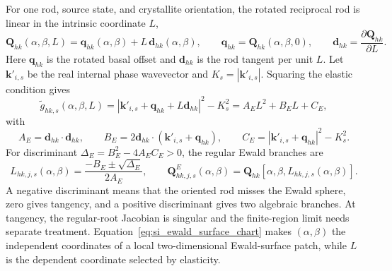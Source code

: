 For one rod, source state, and crystallite orientation, the rotated reciprocal rod is linear in the intrinsic coordinate $L$,
\begin{equation}
  \mathbf Q_{hk}(\alpha,\beta,L)
  =\mathbf q_{hk}(\alpha,\beta)
  +L\,\mathbf d_{hk}(\alpha,\beta),
  \qquad
  \mathbf q_{hk}=\mathbf Q_{hk}(\alpha,\beta,0),
  \qquad
  \mathbf d_{hk}=\frac{\partial\mathbf Q_{hk}}{\partial L}.
  \label{eq:si_oriented_rod_affine_L}
\end{equation}
Here $\mathbf q_{hk}$ is the rotated basal offset and $\mathbf d_{hk}$ is the rod tangent per unit $L$. Let $\mathbf k'_{i,s}$ be the real internal phase wavevector and $K_s=|\mathbf k'_{i,s}|$. Squaring the elastic condition gives
\begin{equation}
  \widetilde g_{hk,s}(\alpha,\beta,L)
  =\left|\mathbf k'_{i,s}+\mathbf q_{hk}+L\mathbf d_{hk}\right|^2-K_s^2
  =A_E L^2+B_E L+C_E,
  \label{eq:si_ewald_quadratic}
\end{equation}
with
\begin{equation}
  A_E=\mathbf d_{hk}\cdot\mathbf d_{hk},
  \qquad
  B_E=2\mathbf d_{hk}\cdot\left(\mathbf k'_{i,s}+\mathbf q_{hk}\right),
  \qquad
  C_E=\left|\mathbf k'_{i,s}+\mathbf q_{hk}\right|^2-K_s^2.
  \label{eq:si_ewald_quadratic_coefficients}
\end{equation}
For discriminant $\Delta_E=B_E^2-4A_EC_E>0$, the regular Ewald branches are
\begin{equation}
  L_{hk,j,s}(\alpha,\beta)
  =\frac{-B_E\pm\sqrt{\Delta_E}}{2A_E},
  \qquad
  \mathbf Q^{E}_{hk,j,s}(\alpha,\beta)
  =\mathbf Q_{hk}\!\left[\alpha,\beta,L_{hk,j,s}(\alpha,\beta)\right].
  \label{eq:si_ewald_surface_chart}
\end{equation}
A negative discriminant means that the oriented rod misses the Ewald sphere, zero gives tangency, and a positive discriminant gives two algebraic branches. At tangency, the regular-root Jacobian is singular and the finite-region limit needs separate treatment. Equation~\eqref{eq:si_ewald_surface_chart} makes $(\alpha,\beta)$ the independent coordinates of a local two-dimensional Ewald-surface patch, while $L$ is the dependent coordinate selected by elasticity.

